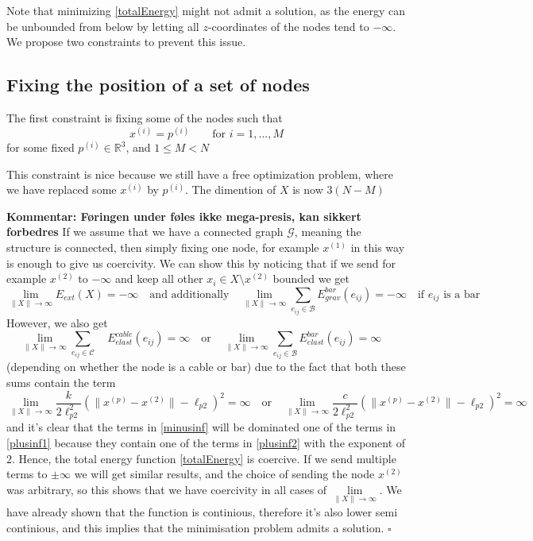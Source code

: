 \documentclass[11pt]{article}
\newcommand{\sumset}[1]{\sum\limits_{e_{ij} \in \mathcal{#1}}}
\newcommand{\ebe}{E^{bar}_{elast}(e_{ij})}
\newcommand{\ebg}{E^{bar}_{grav}(e_{ij})}
\newcommand{\ece}{E^{cable}_{elast}(e_{ij})}
\newcommand{\ee}{E_{ext}(X)}
\newcommand{\xinf}{\lim\limits_{\rVert X \lVert \to \infty}}
\begin{document}
Note that minimizing \eqref{totalEnergy} might not admit a solution, as the energy can be unbounded from below by letting all $z$-coordinates of the nodes tend to $-\infty$. We propose two constraints to prevent this issue. 

\subsection{Fixing the position of a set of nodes}
The first constraint is fixing some of the nodes such that 
\begin{equation}
    x^{(i)} = p^{(i)} \qquad \text{for } i = 1,...,M
\end{equation} for some fixed $p^{(i)} \in \mathbb{R}^3$, and $1\leq M < N$

This constraint is nice because we still have a free optimization problem, where we have replaced some $x^{(i)}$ by $p^{(i)}$. The dimention of $X$ is now $3(N-M)$

\textbf{Kommentar: Føringen under føles ikke mega-presis, kan sikkert forbedres}
If we assume that we have a connected graph $\mathcal{G}$, meaning the structure is connected, then simply fixing one node, for example $x^{(1)}$ in this way is enough to give us coercivity. We can show this by noticing that if we send for example $x^{(2)}$ to $-\infty$ and keep all other $x_i \in X \setminus x^{(2)}$ bounded we get 
\begin{equation}
  \xinf \ee = -\infty
\quad\text{and additionally}\quad 
\xinf \sumset{B} \ebg = -\infty \quad \text{if $e_{ij}$ is a bar}
\label{minusinf}
\end{equation} 
However, we also get 
\begin{equation}
     \xinf \sumset{C}\quad \ece = \infty \quad \text{or}\quad \xinf \sumset{B }\ebe = \infty \quad 
     \label{plusinf1}
\end{equation} (depending on whether the node is a cable or bar)
due to the fact that both these sums contain the term \begin{equation}
 \xinf \frac{k}{2 \ell_{p2}^2}(\lVert x^{(p)} - x^{(2)} \rVert-\ell_{p2})^2 = \infty \quad \text{or} \quad \xinf \frac{c}{2 \ell_{p2}^2}(\lVert x^{(p)} - x^{(2)} \rVert-\ell_{p2})^2 = \infty
 \label{plusinf2}
\end{equation}
and it's clear that the terms in \eqref{minusinf} will be dominated one of the terms in \eqref{plusinf1} because they contain one of the terms in \eqref{plusinf2} with the exponent of $2$. Hence, the total energy function \eqref{totalEnergy} is coercive. If we send multiple terms to $\pm \infty$ we will get similar results, and the choice of sending the node $x^{(2)}$ was arbitrary, so this shows that we have coercivity in all cases of $\xinf$. We have already shown that the function is continious, therefore it's also lower semi continious, and this implies that the minimisation problem admits a solution. $\square$
\end{document}
